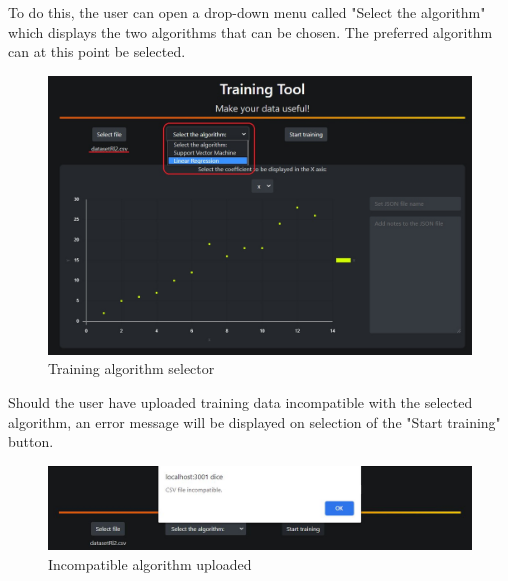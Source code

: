 To do this, the user can open a drop-down menu called "Select the algorithm" which displays the two algorithms that can be chosen. The preferred algorithm can at this point be selected.
\begin{figure}[H]
\centering
\includegraphics[scale=0.65]{img/tool/screen_2_tool.JPG}
\caption{Training algorithm selector}
\end{figure}
Should the user have uploaded training data incompatible with the selected algorithm, an error message will be displayed on selection of the "Start training" button.\newline
\begin{figure}[H]
\centering
\includegraphics[scale=0.65]{img/tool/error_alg.JPG}
\caption{Incompatible algorithm uploaded}
\end{figure}
\newpage
